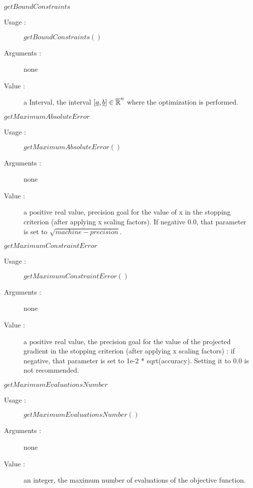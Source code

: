 \begin{description}
\item[Some methods :]  \rule{0pt}{1em}

  \begin{description}

  \item $getBoundConstraints$
    \begin{description}
    \item[Usage :] $getBoundConstraints()$
    \item[Arguments :] none
    \item[Value :]  a Interval, the interval $[{\underline{a}},{\underline{b}}] \in \overline{\mathbb{R}}^n$ where the optimization is performed.
    \end{description}
    \bigskip

  \item $getMaximumAbsoluteError$
    \begin{description}
    \item[Usage :] $getMaximumAbsoluteError()$
    \item[Arguments :] none
    \item[Value :] a positive real value, precision goal for the value of x in the stopping criterion (after applying x scaling factors). If negative 0.0, that parameter is set to $\sqrt{machine-precision}$.
    \end{description}
    \bigskip

  \item $getMaximumConstraintError$
    \begin{description}
    \item[Usage :] $getMaximumConstraintError()$
    \item[Arguments :] none
    \item[Value :] a positive real value, the precision goal for the value of the projected gradient in the stopping criterion (after applying x scaling factors) : if negative, that parameter is set to 1e-2 * sqrt(accuracy). Setting it to 0.0 is not recommended.
    \end{description}
    \bigskip

  \item $getMaximumEvaluationsNumber$
    \begin{description}
    \item[Usage :] $getMaximumEvaluationsNumber()$
    \item[Arguments :] none
    \item[Value :] an integer, the maximum number of evaluations of the objective function.
    \end{description}
    \bigskip


\end{description}
\end{description}
